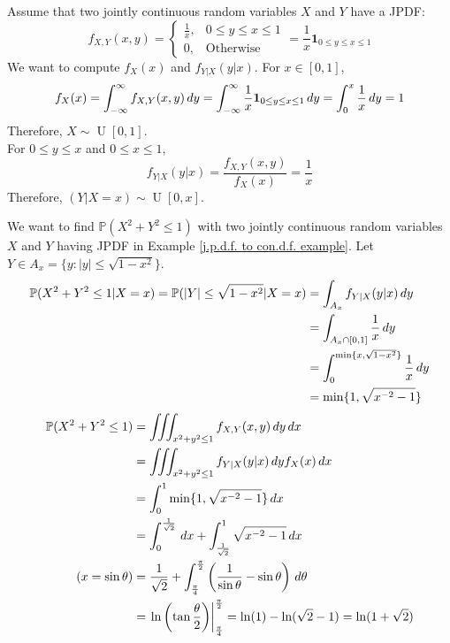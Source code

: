 \documentclass{huhtakm-template-book}
\newcommand{\prob}{\mathbb{P}}
\DeclareMathOperator{\U}{U}
\begin{document}
\newpage
\begin{eg}
	\label{j.p.d.f. to con.d.f. example}
	Assume that two jointly continuous random variables $X$ and $Y$ have a JPDF:
	\begin{equation*}
		f_{X,Y}(x,y)=\begin{cases}
			\frac{1}{x}, &0\leq y\leq x\leq 1\\
			0, &\text{Otherwise}
		\end{cases}=\frac{1}{x}\mathbf{1}_{0\leq y\leq x\leq 1}
	\end{equation*}
	We want to compute $f_{X}(x)$ and $f_{Y|X}(y|x)$.
	For $x\in [0,1]$,
	\begin{equation*}
		f_{X}(x)=\int_{-\infty}^{\infty} f_{X,Y}(x,y)\,dy=\int_{-\infty}^{\infty}\frac{1}{x}\mathbf{1}_{0\leq y\leq x\leq 1}\,dy=\int_{0}^{x}\frac{1}{x}\,dy=1
	\end{equation*}
	Therefore, $X\sim\U[0,1]$.\\
	For $0\leq y\leq x$ and $0\leq x\leq 1$,
	\begin{equation*}
		f_{Y|X}(y|x)=\frac{f_{X,Y}(x,y)}{f_{X}(x)}=\frac{1}{x}
	\end{equation*}
	Therefore, $(Y|X=x)\sim\U[0,x]$.
\end{eg}
\begin{eg}
	We want to find $\prob(X^{2}+Y^{2}\leq 1)$ with two jointly continuous random variables $X$ and $Y$ having JPDF in Example \ref{j.p.d.f. to con.d.f. example}. Let $Y\in A_{x}=\{y:|y|\leq\sqrt{1-x^{2}}\}$.
	\begin{align*}
		\prob(X^{2}+Y^{2}\leq 1|X=x)=\prob(|Y|\leq\sqrt{1-x^{2}}|X=x)&=\int_{A_{x}}f_{Y|X}(y|x)\,dy\\
		&=\int_{A_{x}\cap[0,1]}\frac{1}{x}\,dy\\
		&=\intlu{0}{\min\{x,\sqrt{1-x^{2}}\}}\frac{1}{x}\,dy\\
		&=\min\{1,\sqrt{x^{-2}-1}\}
	\end{align*}
	\begin{align*}
		\prob(X^{2}+Y^{2}\leq 1)&=\iiint_{x^{2}+y^{2}\leq 1}f_{X,Y}(x,y)\,dy\,dx\\
		&=\iiint_{x^{2}+y^{2}\leq 1}f_{Y|X}(y|x)\,dy f_{X}(x)\,dx\\
		&=\intlu{0}{1}\min\{1,\sqrt{x^{-2}-1}\}\,dx\\
		&=\intlu{0}{\frac{1}{\sqrt{2}}}\,dx+\intlu{\frac{1}{\sqrt{2}}}{1}\sqrt{x^{-2}-1}\,dx\\
		\tag{$x=\sin\theta$}
		&=\frac{1}{\sqrt{2}}+\intlu{\frac{\pi}{4}}{\frac{\pi}{2}}\left(\frac{1}{\sin\theta}-\sin\theta\right)\,d\theta\\
		&=\left.\ln\left(\tan\frac{\theta}{2}\right)\right|_{\frac{\pi}{4}}^{\frac{\pi}{2}}=\ln(1)-\ln(\sqrt{2}-1)=\ln(1+\sqrt{2})
	\end{align*}
\end{eg}
\end{document}
